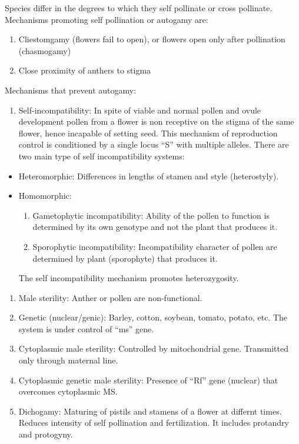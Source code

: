 \documentclass[
]{book}
\providecommand{\tightlist}{%
  \setlength{\itemsep}{0pt}\setlength{\parskip}{0pt}}
\begin{document}
Species differ in the degrees to which they self pollinate or cross pollinate. Mechanisms promoting self pollination or autogamy are:

\begin{enumerate}
\def\labelenumi{\arabic{enumi}.}
\tightlist
\item
  Cliestomgamy (flowers fail to open), or flowers open only after pollination (chasmogamy)
\item
  Close proximity of anthers to stigma
\end{enumerate}

Mechanisms that prevent autogamy:

\begin{enumerate}
\def\labelenumi{\arabic{enumi}.}
\tightlist
\item
  Self-incompatibility: In spite of viable and normal pollen and ovule development pollen from a flower is non receptive on the stigma of the same flower, hence incapable of setting seed. This mechanism of reproduction control is conditioned by a single locus ``S'' with multiple alleles. There are two main type of self incompatibility systems:
\end{enumerate}

\begin{itemize}
\tightlist
\item
  Heteromorphic: Differences in lengths of stamen and style (heterostyly).
\item
  Homomorphic:

  \begin{enumerate}
  \def\labelenumi{\arabic{enumi}.}
  \tightlist
  \item
    Gametophytic incompatibility: Ability of the pollen to function is determined by its own genotype and not the plant that produces it.
  \item
    Sporophytic incompatibility: Incompatibility character of pollen are determined by plant (sporophyte) that produces it.
  \end{enumerate}

  The self incompatibility mechanism promotes heterozygosity.
\end{itemize}

\begin{enumerate}
\def\labelenumi{\arabic{enumi}.}
\setcounter{enumi}{1}
\item
  Male sterility: Anther or pollen are non-functional.
\item
  Genetic (nuclear/genic): Barley, cotton, soybean, tomato, potato, etc. The system is under control of ``ms'' gene.
\item
  Cytoplasmic male sterility: Controlled by mitochondrial gene. Transmitted only through maternal line.
\item
  Cytoplasmic genetic male sterility: Presence of ``Rf'' gene (nuclear) that overcomes cytoplasmic MS.
\item
  Dichogamy: Maturing of pistils and stamens of a flower at differnt times. Reduces intensity of self pollination and fertilization. It includes protandry and protogyny.
\end{enumerate}
\end{document}
